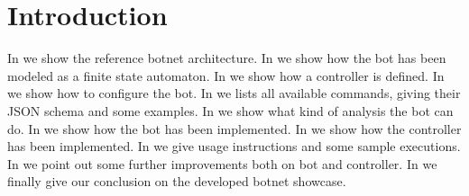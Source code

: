 \section{Introduction}
\label{sec:introduction}

In  we show the reference botnet architecture.
In  we show how the bot has been modeled as a finite state automaton.
In  we show how a controller is defined.
In  we show how to configure the bot.
In  we lists all available commands, giving their JSON schema and some examples.
In  we show what kind of analysis the bot can do.
In  we show how the bot has been implemented.
In  we show how the controller has been implemented.
In  we give usage instructions and some sample executions.
In  we point out some further improvements both on bot and controller.
In  we finally give our conclusion on the developed botnet showcase.
